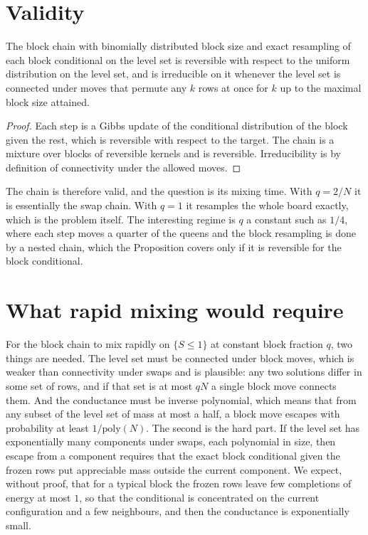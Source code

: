\section{Validity}

\begin{proposition}
\label{prop:blockvalid}
The block chain with binomially distributed block size and exact resampling of each block conditional on the level set is reversible with respect to the uniform distribution on the level set, and is irreducible on it whenever the level set is connected under moves that permute any $k$ rows at once for $k$ up to the maximal block size attained.
\end{proposition}

\begin{proof}
Each step is a Gibbs update of the conditional distribution of the block given the rest, which is reversible with respect to the target. The chain is a mixture over blocks of reversible kernels and is reversible. Irreducibility is by definition of connectivity under the allowed moves.
\end{proof}

The chain is therefore valid, and the question is its mixing time. With $q = 2/N$ it is essentially the swap chain. With $q = 1$ it resamples the whole board exactly, which is the problem itself. The interesting regime is $q$ a constant such as $1/4$, where each step moves a quarter of the queens and the block resampling is done by a nested chain, which the Proposition covers only if it is reversible for the block conditional.

\section{What rapid mixing would require}

For the block chain to mix rapidly on $\{ S \le 1 \}$ at constant block fraction $q$, two things are needed. The level set must be connected under block moves, which is weaker than connectivity under swaps and is plausible: any two solutions differ in some set of rows, and if that set is at most $qN$ a single block move connects them. And the conductance must be inverse polynomial, which means that from any subset of the level set of mass at most a half, a block move escapes with probability at least $1/\mathrm{poly}(N)$. The second is the hard part. If the level set has exponentially many components under swaps, each polynomial in size, then escape from a component requires that the exact block conditional given the frozen rows put appreciable mass outside the current component. We expect, without proof, that for a typical block the frozen rows leave few completions of energy at most $1$, so that the conditional is concentrated on the current configuration and a few neighbours, and then the conductance is exponentially small.

